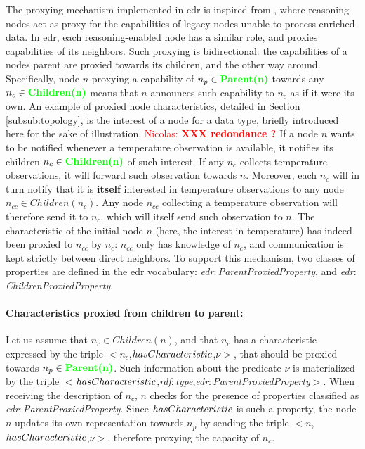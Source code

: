 \documentclass{iosart2c}
\newcommand{\Nicolas}[1]{\textcolor{red}{ Nicolas: \textbf{#1} }}
\newcommand{\added}[1]{\textcolor{green}{\textbf{#1}}}
\newcommand{\namespace}[1]{\textit{#1$:$}}
\newcommand{\concept}[2]{\namespace{#1}\-\textit{#2}}
\newcommand{\triplet}[3]{$<$#1,\textit{#2},#3$>$}
\begin{document}
The proxying mechanism implemented in \gls{edr} is inspired from \cite{Nikoli2011}, where reasoning nodes act as proxy for the capabilities of legacy nodes unable to process enriched data. 
In \gls{edr}, each reasoning-enabled node has a similar role, and proxies capabilities of its neighbors. 
Such proxying is bidirectional: the capabilities of a nodes parent are proxied towards its children, and the other way around.
Specifically, node $n$ proxying a capability of $n_{p}\in \added{Parent(n)}$ towards any $n_{c}\in \added{Children(n)}$ means that $n$ announces such capability to $n_{c}$ as if it were its own.
An example of proxied node characteristics, detailed in Section \textsection \ref{subsub:topology}, is the interest of a node for a data type, briefly introduced here for the sake of illustration.
\Nicolas{XXX redondance ?}
If a node $n$ wants to be notified whenever a temperature observation is available, it notifies its children $n_{c}\in \added{Children(n)}$ of such interest. 
If any $n_{c}$ collects temperature observations, it will forward such observation towards $n$. 
Moreover, each $n_{c}$ will in turn notify that it is \textbf{itself} interested in temperature observations to any node $n_{cc}\in Children(n_c)$.
Any node $n_{cc}$ collecting a temperature observation will therefore send it to $n_{c}$, which will itself send such observation to $n$.
The characteristic of the initial node $n$ (here, the interest in temperature) has indeed been proxied to $n_{cc}$ by $n_{c}$: $n_{cc}$ only has knowledge of $n_{c}$, and communication is kept strictly between direct neighbors.
To support this mechanism, two classes of properties are defined in the \gls{edr} vocabulary: \concept{edr}{Parent\-Proxied\-Property}, and \concept{edr}{Children\-Proxied\-Property}.

\paragraph{Characteristics proxied from children to parent:}
Let us assume that $n_{c}\in Children(n)$, and that $n_{c}$ has a characteristic expressed by the triple \triplet{$n_{c}$}{$has\-Cha\-racteri\-stic$}{$\nu$}, that should be proxied towards $n_{p}\in \added{Parent(n)}$.
Such information about the predicate $\nu$ is materialized by the triple \triplet{$has\-Characteri\-stic$}{\concept{rdf}{type}}{\concept{edr}{Parent\-Proxied\-Property}}.
When receiving the description of $n_{c}$, $n$ checks for the presence of properties classified as \concept{edr}{Parent\-Proxied\-Property}. 
Since $has\-Characteristic$ is such a property, the node $n$ updates its own representation towards $n_p$ by sending the triple \triplet{$n$}{$has\-Characteri\-stic$}{$\nu$}, therefore proxying the capacity of $n_{c}$.
\end{document}
